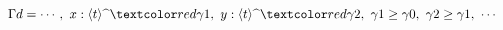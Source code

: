 \begin{frame}
  {\footnotesize
    \begin{align*}
      \Gamma d &= \cdots,~ x:\codeTs{t}{\red{\gamma1}},~ y:\codeTs{t}{\red{\gamma2}},~ \gamma1 \ord \gamma0,~ \gamma2 \ord \gamma1,~ \cdots
    \end{align*}
  }

\end{frame}

